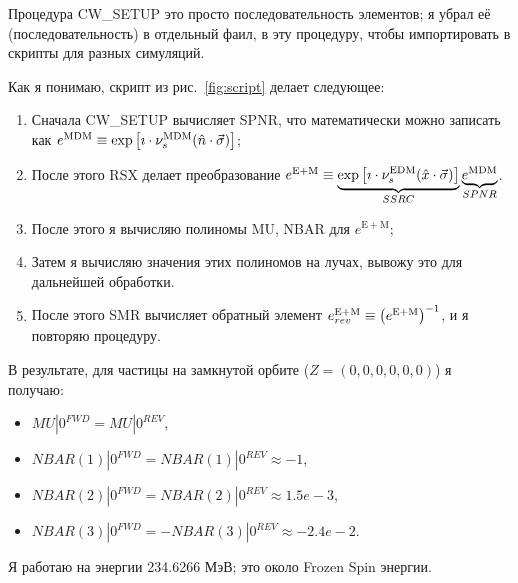 \documentclass{article}
\newcommand{\MDM}{^\mathrm{MDM}}
\newcommand{\EDM}{^\mathrm{EDM}}
\newcommand{\EMDM}{^\mathrm{E+M}}
\newcommand{\pauli}{\vec{\sigma}}
\begin{document}
Процедура CW\_SETUP это просто последовательность элементов; я убрал её (последовательность) в отдельный фаил, в эту процедуру, чтобы импортировать в скрипты для разных симуляций.

Как я понимаю, скрипт из рис.~\ref{fig:script} делает следующее:
\begin{enumerate}
	\item Сначала CW\_SETUP вычисляет SPNR, что математически можно записать как $e\MDM \equiv \exp\bkt*{\imath\cdot \nu_s\MDM(\hat n \cdot \pauli)}$;
	\item После этого RSX делает преобразование $e\EMDM \equiv \underbrace{\exp\bkt*{\imath\cdot \nu_s\EDM(\hat x \cdot \pauli)}}_{SSRC} \underbrace{e\MDM}_{SPNR}$.
	\item После этого я вычисляю полиномы MU, NBAR для $e\EMDM$;
	\item Затем я вычисляю значения этих полиномов на лучах, вывожу это для дальнейшей обработки.
	\item После этого SMR вычисляет обратный элемент $e\EMDM_{rev} \equiv \bkt{e\EMDM}^{-1}$, и я повторяю процедуру.
\end{enumerate}

В результате, для частицы на замкнутой орбите ($Z = (0,0,0,0,0,0)$) я получаю:
\begin{itemize}
	\item $MU|0^{FWD} = MU|0^{REV}$,
	\item $NBAR(1)|0^{FWD} = NBAR(1)|0^{REV} \approx -1$,
	\item $NBAR(2)|0^{FWD} = NBAR(2)|0^{REV} \approx 1.5e-3$,
	\item $NBAR(3)|0^{FWD} = - NBAR(3)|0^{REV} \approx -2.4e-2$.
\end{itemize} 

Я работаю на энергии 234.6266 МэВ; это около Frozen Spin энергии.
\end{document}
